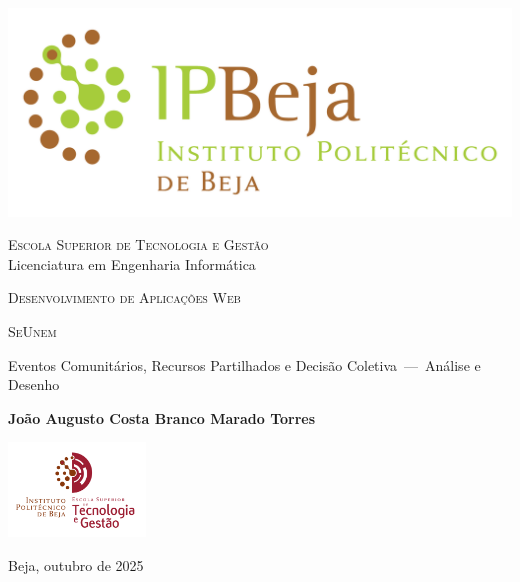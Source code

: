 \documentclass[12pt,a4paper,openright,oneside]{memoir}
\newcommand{\School}{Escola Superior de Tecnologia e Gestão}
\newcommand{\Degree}{Licenciatura em Engenharia Informática}
\newcommand{\Course}{Desenvolvimento de Aplicações Web}
\newcommand{\Title}{SeUnem}
\newcommand{\Subtitle}{Eventos Comunitários, Recursos Partilhados e Decisão Coletiva\mbox{ --- }Análise e Desenho}
\newcommand{\Author}{João Augusto Costa Branco Marado Torres}
\newcommand{\Date}{Beja, outubro de 2025}
\begin{document}
\thispagestyle{empty}

\begin{center}
    \includegraphics{Logotipo_IPBeja_horizontal-5/IPbeja_horizontal}

    \bigskip

    \textsc{\large \School}\\{\large \Degree}

    \bigskip

    \textsc{\large \Course}

    \vspace{4\baselineskip}

    \textsc{\Huge \Title}

    \smallskip

    {\Large \Subtitle}

    \bigskip

    {\large\bfseries \Author}

    \vfill

    \begin{center}
        \includegraphics[height=25mm,keepaspectratio]{Logotipos_ESTIG/estig}%
    \end{center}

    \vfill

    {\footnotesize \Date}
\end{center}

\cleardoublepage
\end{document}
